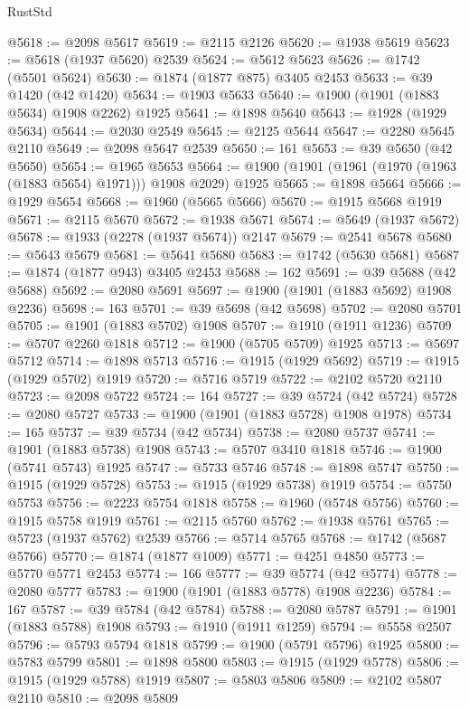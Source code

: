 \begin{lexlean}{RustStd}
\begin{coremodule}
{\begin{coremodule}
{{{{{{{{{{{{{{{{{{{{{{{{{{{{{{{{{{{{{{{{{{{@5618 := @2098 @5617
@5619 := @2115 @2126
@5620 := @1938 @5619
@5623 := @5618 (@1937 @5620) @2539
@5624 := @5612 @5623
@5626 := @1742 (@5501 @5624)
@5630 := @1874 (@1877 @875) @3405 @2453
@5633 := @39 @1420 (@42 @1420)
@5634 := @1903 @5633
@5640 := @1900 (@1901 (@1883 @5634) @1908 @2262) @1925
@5641 := @1898 @5640
@5643 := @1928 (@1929 @5634)
@5644 := @2030 @2549
@5645 := @2125 @5644
@5647 := @2280 @5645 @2110
@5649 := @2098 @5647 @2539
@5650 := 161
@5653 := @39 @5650 (@42 @5650)
@5654 := @1965 @5653
@5664 := @1900 (@1901 (@1961 (@1970 (@1963 (@1883 @5654) @1971))) @1908 @2029) @1925
@5665 := @1898 @5664
@5666 := @1929 @5654
@5668 := @1960 (@5665 @5666)
@5670 := @1915 @5668 @1919
@5671 := @2115 @5670
@5672 := @1938 @5671
@5674 := @5649 (@1937 @5672)
@5678 := @1933 (@2278 (@1937 @5674)) @2147
@5679 := @2541 @5678
@5680 := @5643 @5679
@5681 := @5641 @5680
@5683 := @1742 (@5630 @5681)
@5687 := @1874 (@1877 @943) @3405 @2453
@5688 := 162
@5691 := @39 @5688 (@42 @5688)
@5692 := @2080 @5691
@5697 := @1900 (@1901 (@1883 @5692) @1908 @2236)
@5698 := 163
@5701 := @39 @5698 (@42 @5698)
@5702 := @2080 @5701
@5705 := @1901 (@1883 @5702) @1908
@5707 := @1910 (@1911 @1236)
@5709 := @5707 @2260 @1818
@5712 := @1900 (@5705 @5709) @1925
@5713 := @5697 @5712
@5714 := @1898 @5713
@5716 := @1915 (@1929 @5692)
@5719 := @1915 (@1929 @5702) @1919
@5720 := @5716 @5719
@5722 := @2102 @5720 @2110
@5723 := @2098 @5722
@5724 := 164
@5727 := @39 @5724 (@42 @5724)
@5728 := @2080 @5727
@5733 := @1900 (@1901 (@1883 @5728) @1908 @1978)
@5734 := 165
@5737 := @39 @5734 (@42 @5734)
@5738 := @2080 @5737
@5741 := @1901 (@1883 @5738) @1908
@5743 := @5707 @3410 @1818
@5746 := @1900 (@5741 @5743) @1925
@5747 := @5733 @5746
@5748 := @1898 @5747
@5750 := @1915 (@1929 @5728)
@5753 := @1915 (@1929 @5738) @1919
@5754 := @5750 @5753
@5756 := @2223 @5754 @1818
@5758 := @1960 (@5748 @5756)
@5760 := @1915 @5758 @1919
@5761 := @2115 @5760
@5762 := @1938 @5761
@5765 := @5723 (@1937 @5762) @2539
@5766 := @5714 @5765
@5768 := @1742 (@5687 @5766)
@5770 := @1874 (@1877 @1009)
@5771 := @4251 @4850
@5773 := @5770 @5771 @2453
@5774 := 166
@5777 := @39 @5774 (@42 @5774)
@5778 := @2080 @5777
@5783 := @1900 (@1901 (@1883 @5778) @1908 @2236)
@5784 := 167
@5787 := @39 @5784 (@42 @5784)
@5788 := @2080 @5787
@5791 := @1901 (@1883 @5788) @1908
@5793 := @1910 (@1911 @1259)
@5794 := @5558 @2507
@5796 := @5793 @5794 @1818
@5799 := @1900 (@5791 @5796) @1925
@5800 := @5783 @5799
@5801 := @1898 @5800
@5803 := @1915 (@1929 @5778)
@5806 := @1915 (@1929 @5788) @1919
@5807 := @5803 @5806
@5809 := @2102 @5807 @2110
@5810 := @2098 @5809
}}}}}}}}}}}}}}}}}}}}}}}}}}}}}}}}}}}}}}}}}}}
\end{coremodule}}
\end{coremodule}
\end{lexlean}
